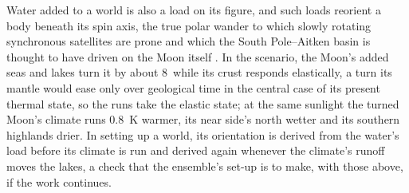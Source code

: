 Water added to a world is also a load on its figure, and such loads reorient a body beneath its spin axis, the true
polar wander to which slowly rotating synchronous satellites are prone \autocite{matsuyama2014planetary} and which
the South Pole--Aitken basin is thought to have driven on the Moon itself \autocite{keane2014evidence}. In the
scenario, the Moon's added seas and lakes turn it by about 8\textdegree\ while its crust responds elastically, a
turn its mantle would ease only over geological time in the central case of its present thermal state, so the runs
take the elastic state; at the same sunlight the turned Moon's climate runs 0.8~K warmer, its near side's north
wetter and its southern highlands drier. In setting up a world, its orientation is derived from
the water's load before its climate is run and derived again whenever the climate's runoff moves the lakes, a check
that the ensemble's set-up is to make, with those above, if the work continues.
